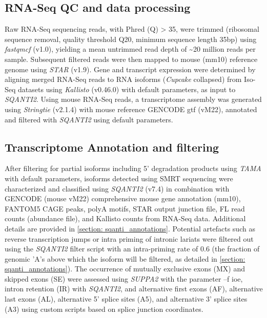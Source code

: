 \subsection{RNA-Seq QC and data processing}
Raw RNA-Seq sequencing reads, with Phred (Q) > 35, were trimmed (ribosomal sequence removal, quality threshold Q20, minimum sequence length 35bp) using \textit{fastqmcf} (v1.0), yielding a mean untrimmed read depth of \textasciitilde20 million reads per sample. Subsequent filtered reads were then mapped to mouse (mm10) reference genome using \textit{STAR}\cite{Dobin2013} (v1.9). Gene and transcript expression were determined by aligning merged RNA-Seq reads to RNA isoforms (\textit{Cupcake} collapsed) from Iso-Seq datasets using \textit{Kallisto}\cite{Bray2016} (v0.46.0) with default parameters, as input to \textit{SQANTI2}. Using mouse RNA-Seq reads, a transcriptome assembly was generated using \textit{Stringtie}\cite{Pertea2015} (v2.1.4) with mouse reference GENCODE gtf (vM22), annotated and filtered with \textit{SQANTI2} using default parameters. 

\subsection{Transcriptome Annotation and filtering}
\label{ch4: transcriptome_annotation}
After filtering for partial isoforms including 5’ degradation products using \textit{TAMA} with default parameters, isoforms detected using SMRT sequencing were characterized and classified using \textit{SQANTI2} (v7.4) in combination with GENCODE (mouse vM22) comprehensive mouse gene annotation (mm10), FANTOM5 CAGE peaks, polyA motifs, STAR output junction file, FL read counts (abundance file), and Kallisto counts from RNA-Seq data. Additional details are provided in \cref{section: sqanti_annotations}. Potential artefacts such as reverse transcription jumps or intra priming of intronic lariats were filtered out using the \textit{SQANTI2} filter script with an intra-priming rate of 0.6 (the fraction of genomic 'A's above which the isoform will be filtered, as detailed in \cref{section: sqanti_annotations}). The occurrence of mutually exclusive exons (MX) and skipped exons (SE) were assessed using \textit{SUPPA2}\cite{Trincado2018} with the parameter –f ioe, intron retention (IR) with \textit{SQANTI2}, and alternative first exons (AF), alternative last exons (AL), alternative 5’ splice sites (A5), and alternative 3’ splice sites (A3) using custom scripts based on splice junction coordinates. 

